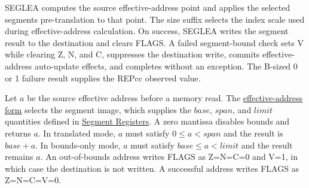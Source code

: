 SEGLEA computes the source effective-address point and applies the selected segment\textquotesingle{}s pre-translation to that point. The size suffix selects the index scale used during effective-address calculation. On success, SEGLEA writes the segment result to the destination and clears FLAGS. A failed segment-bound check sets V while clearing Z, N, and C, suppresses the destination write, commits effective-address auto-update effects, and completes without an exception. The B-sized 0 or 1 failure result supplies the REPcc observed value.

Let \(a\) be the source effective address before a memory read. The
\hyperref[page:effective-addressing-modes]{effective-address form} selects the segment image, which supplies the
\(\mathit{base}\), \(\mathit{span}\), and \(\mathit{limit}\) quantities defined in
\hyperref[section:segment-registers]{Segment Registers}.
A zero mantissa disables bounds and returns \(a\). In translated mode, \(a\) must satisfy
\(0 \le a < \mathit{span}\) and the result is \(\mathit{base}+a\). In bounds-only mode, \(a\) must satisfy
\(\mathit{base} \le a < \mathit{limit}\) and the result remains \(a\). An out-of-bounds address writes FLAGS as
Z=N=C=0 and V=1, in which case the destination is not written. A successful address writes FLAGS as Z=N=C=V=0.
